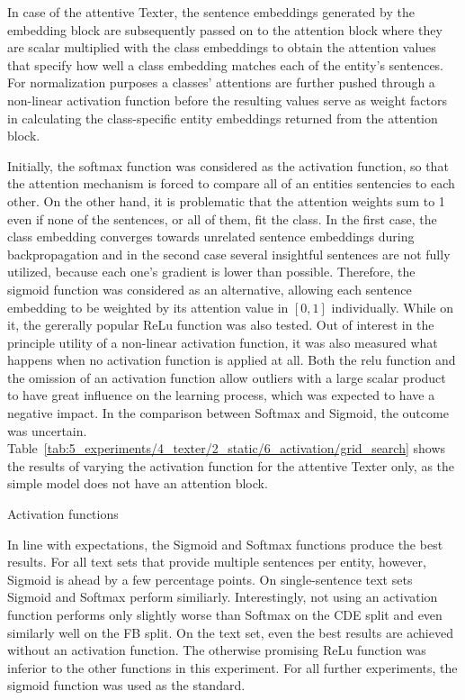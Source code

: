 In case of the attentive Texter, the sentence embeddings generated by the embedding block are subsequently passed on to the attention block where they are scalar multiplied with the class embeddings to obtain the attention values that specify how well a class embedding matches each of the entity's sentences. For normalization purposes a classes' attentions are further pushed through a non-linear activation function before the resulting values serve as weight factors in calculating the class-specific entity embeddings returned from the attention block.

Initially, the softmax function was considered as the activation function, so that the attention mechanism is forced to compare all of an entities sentencies to each other. On the other hand, it is problematic that the attention weights sum to 1 even if none of the sentences, or all of them, fit the class. In the first case, the class embedding converges towards unrelated sentence embeddings during backpropagation and in the second case several insightful sentences are not fully utilized, because each one's gradient is lower than possible. Therefore, the sigmoid function was considered as an alternative, allowing each sentence embedding to be weighted by its attention value in $[0, 1]$ individually. While on it, the gererally popular ReLu function was also tested. Out of interest in the principle utility of a non-linear activation function, it was also measured what happens when no activation function is applied at all. Both the relu function and the omission of an activation function allow outliers with a large scalar product to have great influence on the learning process, which was expected to have a negative impact. In the comparison between Softmax and Sigmoid, the outcome was uncertain. Table~\ref{tab:5_experiments/4_texter/2_static/6_activation/grid_search} shows the results of varying the activation function for the attentive Texter only, as the simple model does not have an attention block.

\begin{table}[t]
    \centering
    
    \caption{Activation functions}
    \label{tab:5_experiments/4_texter/2_static/6_activation/grid_search}
\end{table}

In line with expectations, the Sigmoid and Softmax functions produce the best results. For all text sets that provide multiple sentences per entity, however, Sigmoid is ahead by a few percentage points. On single-sentence text sets Sigmoid and Softmax perform similiarly. Interestingly, not using an activation function performs only slightly worse than Softmax on the CDE split and even similarly well on the FB split. On the text set, even the best results are achieved without an activation function. The otherwise promising ReLu function was inferior to the other functions in this experiment. For all further experiments, the sigmoid function was used as the standard.
